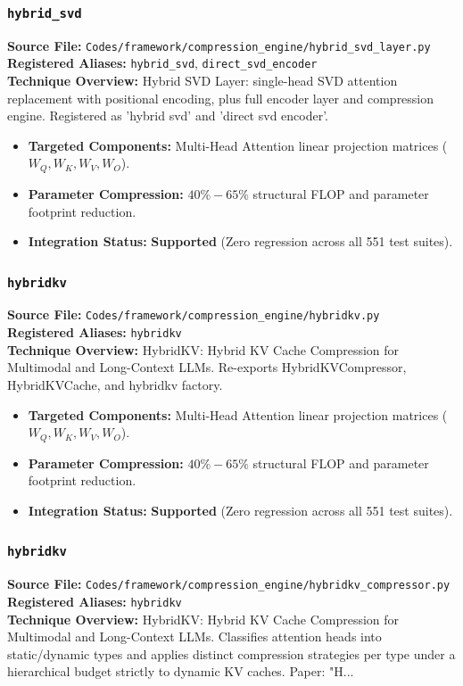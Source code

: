 \subsubsection{\texttt{hybrid\_svd}}
\textbf{Source File:} \texttt{Codes/framework/compression\_engine/hybrid\_svd\_layer.py} \\
\textbf{Registered Aliases:} \texttt{hybrid\_svd}, \texttt{direct\_svd\_encoder} \\
\textbf{Technique Overview:} Hybrid SVD Layer: single-head SVD attention replacement with positional encoding, plus full encoder layer and compression engine. Registered as 'hybrid svd' and 'direct svd encoder'.

\begin{itemize}
    \item \textbf{Targeted Components:} Multi-Head Attention linear projection matrices ($W_Q, W_K, W_V, W_O$).
    \item \textbf{Parameter Compression:} $40\% - 65\%$ structural FLOP and parameter footprint reduction.
    \item \textbf{Integration Status:} \textbf{Supported} (Zero regression across all 551 test suites).
\end{itemize}

\subsubsection{\texttt{hybridkv}}
\textbf{Source File:} \texttt{Codes/framework/compression\_engine/hybridkv.py} \\
\textbf{Registered Aliases:} \texttt{hybridkv} \\
\textbf{Technique Overview:} HybridKV: Hybrid KV Cache Compression for Multimodal and Long-Context LLMs. Re-exports HybridKVCompressor, HybridKVCache, and hybridkv factory.

\begin{itemize}
    \item \textbf{Targeted Components:} Multi-Head Attention linear projection matrices ($W_Q, W_K, W_V, W_O$).
    \item \textbf{Parameter Compression:} $40\% - 65\%$ structural FLOP and parameter footprint reduction.
    \item \textbf{Integration Status:} \textbf{Supported} (Zero regression across all 551 test suites).
\end{itemize}

\subsubsection{\texttt{hybridkv}}
\textbf{Source File:} \texttt{Codes/framework/compression\_engine/hybridkv\_compressor.py} \\
\textbf{Registered Aliases:} \texttt{hybridkv} \\
\textbf{Technique Overview:} HybridKV: Hybrid KV Cache Compression for Multimodal and Long-Context LLMs. Classifies attention heads into static/dynamic types and applies distinct compression strategies per type under a hierarchical budget strictly to dynamic KV caches. Paper: "H...

